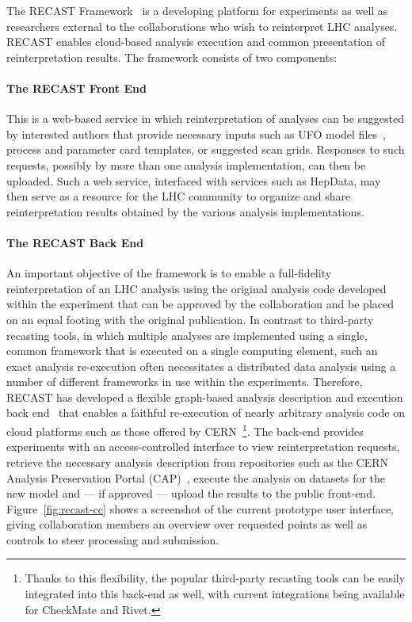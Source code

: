 The RECAST Framework~\cite{Cranmer:2010hk} is a developing platform for experiments as well as researchers external to the collaborations who wish to reinterpret LHC analyses. RECAST enables cloud-based analysis execution and common presentation of reinterpretation results. The framework consists of two components:

\paragraph{The RECAST Front End} This is a web-based service in which reinterpretation of analyses can be suggested by interested authors that provide necessary inputs such as UFO model files~\cite{Degrande:2011ua}, process and parameter card templates, or suggested scan grids. Responses to such requests, possibly by more than one analysis implementation, can then be uploaded. Such a web service, interfaced with services such as HepData, may then serve as a resource for the LHC community to organize and share reinterpretation results obtained by the various analysis implementations.

\paragraph{The RECAST Back End} An important objective of the framework is to enable a full-fidelity reinterpretation of an LHC analysis using the original analysis code developed within the experiment that can be approved by the collaboration and be placed on an equal footing with the original publication. In contrast to third-party recasting tools, in which multiple analyses are implemented using a single, common framework that is executed on a single computing element, such an exact analysis re-execution often necessitates a distributed data analysis using a number of different frameworks in use within the experiments. Therefore, RECAST has developed a flexible graph-based analysis description and execution back end~\cite{Cranmer:2018cqv} that enables a faithful re-execution of nearly arbitrary analysis code on cloud platforms such as those offered by CERN~\footnote{Thanks to this flexibility, the popular third-party recasting tools can be easily integrated into this back-end as well, with current integrations being available for CheckMate and Rivet.}. The back-end provides experiments with an access-controlled interface to view reinterpretation requests, retrieve the necessary analysis description from repositories such as the CERN Analysis Preservation Portal (CAP)~\cite{CAP}, execute the analysis on datasets for the new model and --- if approved --- upload the results to the public front-end. Figure~\ref{fig:recast-cc} shows a screenshot of the current prototype user interface, giving collaboration members an overview over requested points as well as controls to steer processing and submission.

